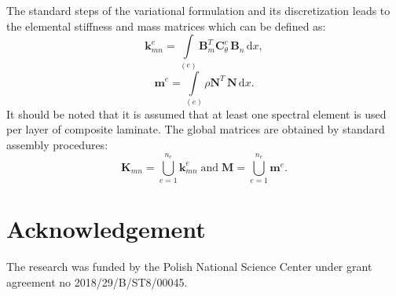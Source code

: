 \documentclass[preprint,12pt]{elsarticle}
\newcommand{\matr}[1]{\mathbf{#1}} %
\newcommand{\ud}{\mathrm{d}}
\begin{document}
	 The standard steps of the variational formulation and its discretization leads to the elemental stiffness and mass matrices which can be defined as:
	 \begin{equation}
	 \matr{k}_{mn}^e= \int \limits_{(e)} \matr{B}_m^{T} \matr{C}_{\theta}^e \, \matr{B}_n\, \ud x ,
	 \label{eq:stiffness_matrix}
	 \end{equation}
	 \begin{equation}
	 \matr{m}^e= \int \limits_{(e)}\rho \matr{N}^{T} \, \matr{N}\, \ud x .
 	\end{equation}
 	It should be noted that it is assumed that at least one spectral element is used per layer of composite laminate.
 	The global matrices are obtained by standard assembly procedures:
 	\begin{equation}
 	\matr{K}_{mn}= \bigcup_{e=1}^{n_e} \matr{k}_{mn}^{e} \; \textrm{and} \; \matr{M}= \bigcup_{e=1}^{n_e} \matr{m}^{e}. 
 	\end{equation}
	\section*{Acknowledgement}
   The research was funded by the Polish National Science Center under grant agreement no 2018/29/B/ST8/00045. 
	
	
	
	
    
	{}
\end{document}
